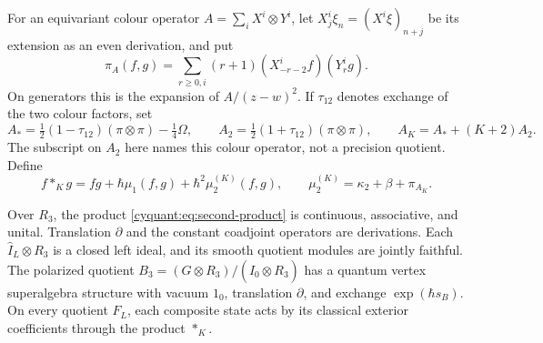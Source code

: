 For an equivariant colour operator $A=\sum_iX^i\otimes Y^i$, let
$X^i_j\xi_n=(X^i\xi)_{n+j}$ be its extension as an even derivation,
and put
\[
 \pi_A(f,g)=\sum_{r\geq0,i}(r+1)
                 (X^i_{-r-2}f)(Y^i_rg).
\]
On generators this is the expansion of $A/(z-w)^2$.
If $\tau_{12}$ denotes exchange of the two colour factors, set
\begin{equation}\label{cyquant:eq:level-colour}
 A_*=\tfrac12(1-\tau_{12})(\pi\otimes\pi)-\tfrac14\Omega,
 \qquad A_2=\tfrac12(1+\tau_{12})(\pi\otimes\pi),
 \qquad A_K=A_*+(K+2)A_2.
\end{equation}
The subscript on $A_2$ here names this colour operator, not a precision
quotient.  Define
\begin{equation}\label{cyquant:eq:second-product}
 f*_Kg=fg+\hbar\mu_1(f,g)+\hbar^2\mu_2^{(K)}(f,g),
 \qquad \mu_2^{(K)}=\kappa_2+\beta+\pi_{A_K}.
\end{equation}

\begin{theorem}\label{cyquant:thm:second-product}
Over $R_3$, the product \eqref{cyquant:eq:second-product} is
continuous, associative, and unital.  Translation $\partial$ and the
constant coadjoint operators are derivations.  Each
$\widehat I_L\otimes R_3$ is a closed left ideal, and its smooth
quotient modules are jointly faithful.  The polarized quotient
$B_3=(G\otimes R_3)/(\widehat I_0\otimes R_3)$ has a quantum vertex
superalgebra structure with vacuum $1_0$, translation $\partial$,
and exchange $\exp(\hbar s_B)$.  On every quotient $F_L$, each
composite state acts by its classical exterior coefficients through
the product $*_K$.
\end{theorem}

